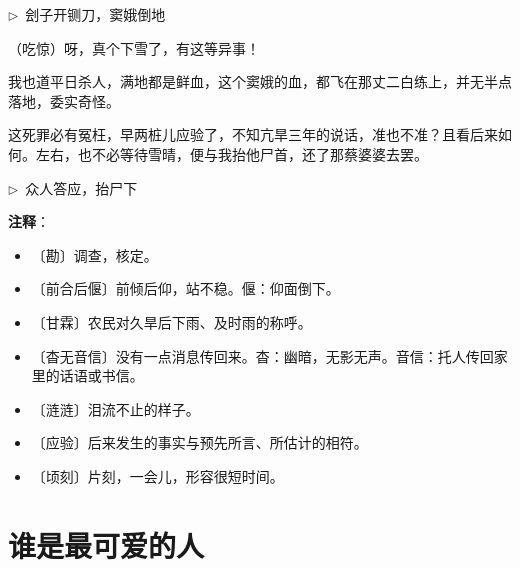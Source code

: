 \documentclass[12pt,UTF-8,openany]{ctexbook}
\begin{document}
\begin{normalsize}
\begin{description}[itemsep=1ex,leftmargin=3.5em,labelwidth=3em]
    \end{description}
    
    \noindent $\triangleright$~刽子开铡刀，窦娥倒地
    
    \begin{description}[itemsep=1ex,leftmargin=3.5em,labelwidth=3em]
    
    \item[{\color{script-5-0} 监斩官}]（吃惊）呀，真个下雪了，有这等异事！
    
    \item[{\color{script-5-1} 刽子}]我也道平日杀人，满地都是鲜血，这个窦娥的血，都飞在那丈二白练上，并无半点落地，委实奇怪。
    
    \item[{\color{script-5-0} 监斩官}]这死罪必有冤枉，早两桩儿应验了，不知亢旱三年的说话，准也不准？且看后来如何。左右，也不必等待雪晴，便与我抬他尸首，还了那蔡婆婆去罢。
    
    \end{description}
    
    \noindent $\triangleright$~众人答应，抬尸下
    
    
\end{normalsize}


\newpage

\textbf{注释}：

\vspace{-1em}

\begin{itemize}
    \setlength\itemsep{-0.2em}
    \item 〔勘〕调查，核定。
    \item 〔前合后偃〕前倾后仰，站不稳。偃：仰面倒下。
    \item 〔甘霖〕农民对久旱后下雨、及时雨的称呼。
    \item 〔杳无音信〕没有一点消息传回来。杳：幽暗，无影无声。音信：托人传回家里的话语或书信。
    \item 〔涟涟〕泪流不止的样子。
    \item 〔应验〕后来发生的事实与预先所言、所估计的相符。
    \item 〔顷刻〕片刻，一会儿，形容很短时间。
\end{itemize}

\chapter{谁是最可爱的人}
\end{document}
